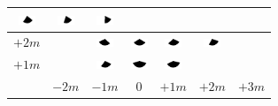 \begin{tabular}{|c|c|c|c|c|c|c|}
	\includegraphics[width=0.5cm]{img_Bereich/V1_vid_Winkel_X_1000_3000.png}&
	\includegraphics[width=0.5cm]{img_Bereich/V1_vid_Winkel_X_2000_3000.png}&
	\includegraphics[width=0.5cm]{img_Bereich/V1_vid_Winkel_X_3000_3000.png}\\ 
	\hline 
	$+2m$ & &
	\includegraphics[width=0.5cm]{img_Bereich/V1_vid_Winkel_X_-1000_2000.png}&
	\includegraphics[width=0.5cm]{img_Bereich/V1_vid_Winkel_X_0_2000.png}&
	\includegraphics[width=0.5cm]{img_Bereich/V1_vid_Winkel_X_1000_2000.png}&
	\includegraphics[width=0.5cm]{img_Bereich/V1_vid_Winkel_X_2000_2000.png}&\\ 
	\hline 
	$+1m$ & &
	\includegraphics[width=0.5cm]{img_Bereich/V1_vid_Winkel_X_-1000_1000.png}&
	\includegraphics[width=0.5cm]{img_Bereich/V1_vid_Winkel_X_0_1000.png}&
	\includegraphics[width=0.5cm]{img_Bereich/V1_vid_Winkel_X_1000_1000.png}& &\\ 
	\hline 
	& $-2m$ & $-1m$ &0& $+1m$ & $+2m$ & $+3m$ \\ 
	\hline 
\end{tabular}